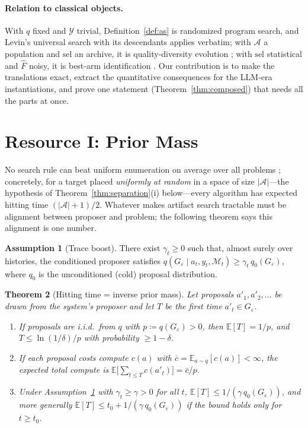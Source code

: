 \documentclass{article}
\theoremstyle{plain}
\newtheorem{theorem}{Theorem}[section]
\theoremstyle{definition}
\newtheorem{assumption}[theorem]{Assumption}
\theoremstyle{remark}
\newcommand{\A}{\mathcal{A}}
\newcommand{\Y}{\mathcal{Y}}
\newcommand{\M}{\mathcal{M}}
\newcommand{\E}{\mathbb{E}}
\newcommand{\sel}{\mathrm{sel}}
\newcommand{\Fhat}{\widehat{F}}
\newcommand{\eps}{\varepsilon}
\begin{document}
\paragraph{Relation to classical objects.}
With $q$ fixed and $\Y$ trivial, Definition~\ref{def:as} is randomized program search, and Levin's universal search \citep{levin1973universal, solomonoff1964formal} with its descendants \citep{schmidhuber2004oops, schmidhuber1997shifting, hutter2005universal, achille2025universal} applies verbatim; with $\A$ a population and $\sel$ an archive, it is quality-diversity evolution \citep{lehman2011abandoning, mouret2015illuminating}; with $\sel$ statistical and $\Fhat$ noisy, it is best-arm identification \citep{maron1994hoeffding, evendar2006action, karnin2013almost, li2017hyperband}. Our contribution is to make the translations exact, extract the quantitative consequences for the LLM-era instantiations, and prove one statement (Theorem~\ref{thm:composed}) that needs all the parts at once.

\section{Resource I: Prior Mass}
\label{sec:prior}

No search rule can beat uniform enumeration on average over all problems \citep{wolpert1997no}; concretely, for a target placed \emph{uniformly at random} in a space of size $|\A|$---the hypothesis of Theorem~\ref{thm:separation}(i) below---every algorithm has expected hitting time $(|\A|+1)/2$. Whatever makes artifact search tractable must be alignment between proposer and problem; the following theorem says this alignment is one number.

\begin{assumption}[Trace boost]
\label{ass:boost}
There exist $\gamma_t \ge 0$ such that, almost surely over histories, the conditioned proposer satisfies $q(G_\eps \mid a_t, y_t, \M_t) \ge \gamma_t\, q_0(G_\eps)$, where $q_0$ is the unconditioned (cold) proposal distribution.
\end{assumption}

\begin{theorem}[Hitting time = inverse prior mass]
\label{thm:hitting}
Let proposals $a'_1, a'_2, \ldots$ be drawn from the system's proposer and let $T$ be the first time $a'_t \in G_\eps$.
\begin{enumerate}\itemsep1pt
\item[(i)] If proposals are i.i.d.\ from $q$ with $p \coloneqq q(G_\eps) > 0$, then $\E[T] = 1/p$, and $T \le \ln(1/\delta)/p$ with probability $\ge 1-\delta$.
\item[(ii)] If each proposal costs compute $c(a)$ with $\bar{c} = \E_{a \sim q}[c(a)] < \infty$, the expected total compute is $\E\big[\sum_{t \le T} c(a'_t)\big] = \bar{c}/p$.
\item[(iii)] Under Assumption~\ref{ass:boost} with $\gamma_t \ge \gamma > 0$ for all $t$, $\E[T] \le 1/(\gamma\, q_0(G_\eps))$, and more generally $\E[T] \le t_0 + 1/(\gamma\, q_0(G_\eps))$ if the bound holds only for $t \ge t_0$.
\end{enumerate}
\end{theorem}
\end{document}
